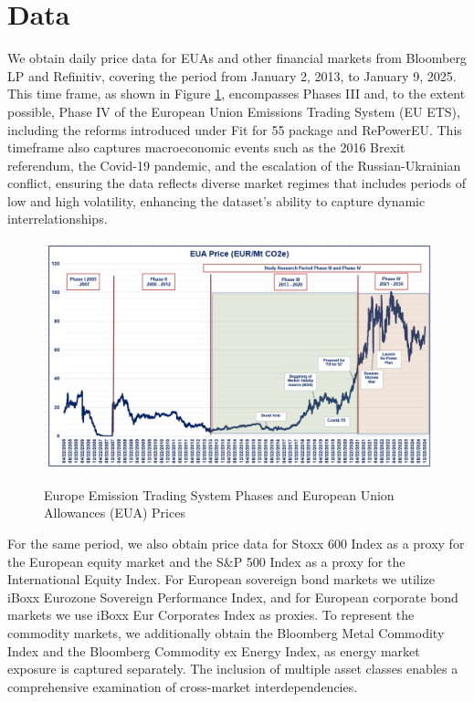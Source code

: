 \documentclass[preprint, 3p,
authoryear]{elsarticle} %
\begin{document}
\hypertarget{data}{%
\section{\texorpdfstring{Data \label{data_section}}{Data }}\label{data}}

We obtain daily price data for EUAs and other financial markets from
Bloomberg LP and Refinitiv, covering the period from January 2, 2013, to
January 9, 2025. This time frame, as shown in Figure \ref{fig:EUAprice},
encompasses Phases III and, to the extent possible, Phase IV of the
European Union Emissions Trading System (EU ETS), including the reforms
introduced under Fit for 55 package and RePowerEU. This timeframe also
captures macroeconomic events such as the 2016 Brexit referendum, the
Covid-19 pandemic, and the escalation of the Russian-Ukrainian conflict,
ensuring the data reflects diverse market regimes that includes periods
of low and high volatility, enhancing the dataset's ability to capture
dynamic interrelationships.

\begin{figure}[ht]
\caption{Europe Emission Trading System Phases and European Union Allowances (EUA) Prices}
\includegraphics[width = \textwidth]{1EUAPrice}
\label{fig:EUAprice}
\end{figure}

For the same period, we also obtain price data for Stoxx 600 Index as a
proxy for the European equity market and the S\&P 500 Index as a proxy
for the International Equity Index. For European sovereign bond markets
we utilize iBoxx Eurozone Sovereign Performance Index, and for European
corporate bond markets we use iBoxx Eur Corporates Index as proxies. To
represent the commodity markets, we additionally obtain the Bloomberg
Metal Commodity Index and the Bloomberg Commodity ex Energy Index, as
energy market exposure is captured separately. The inclusion of multiple
asset classes enables a comprehensive examination of cross-market
interdependencies.
\end{document}
